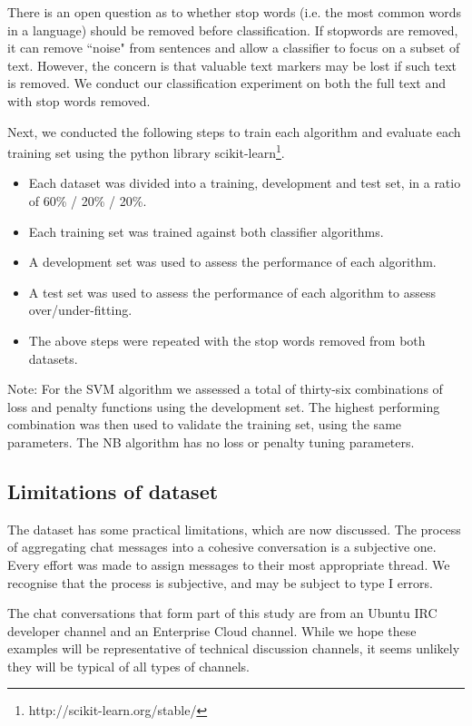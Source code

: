 There is an open question as to whether stop words (i.e. the most common words in a language) should be removed before classification. If stopwords are removed, it can remove ``noise" from sentences and allow a classifier to focus on a subset of text. However, the concern is that valuable text markers may be lost if such text is removed. We conduct our classification experiment on both the full text and with stop words removed.

Next, we conducted the following steps to train each algorithm and evaluate each training set using the python library scikit-learn\footnote{http://scikit-learn.org/stable/}.

\begin{itemize}
  \item Each dataset was divided into a training, development and test set, in a ratio of 60\% / 20\% / 20\%.
  \item Each training set was trained against both classifier algorithms.
  \item A development set was used to assess the performance of each algorithm.
  \item A test set was used to assess the performance of each algorithm to assess over/under-fitting.
  \item The above steps were repeated with the stop words removed from both datasets.
\end{itemize}

Note: For the SVM algorithm we assessed a total of thirty-six combinations of loss and penalty functions using the development set. The highest performing combination was then used to validate the training set, using the same parameters. The NB algorithm has no loss or penalty tuning parameters.

\subsection{Limitations of dataset}

The dataset has some practical limitations, which are now discussed. The process of aggregating chat messages into a cohesive conversation is a subjective one. Every effort was made to assign messages to their most appropriate thread. We recognise that the process is subjective, and may be subject to type I errors. 

The chat conversations that form part of this study are from an Ubuntu IRC developer channel and an Enterprise Cloud channel. While we hope these examples will be representative of technical discussion channels, it seems unlikely they will be typical of all types of channels.



